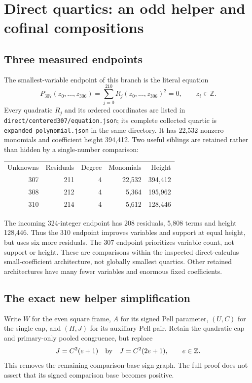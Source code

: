 \section{Direct quartics: an odd helper and cofinal compositions}
\label{sec:round17-direct}

\subsection{Three measured endpoints}
The smallest-variable endpoint of this branch is the literal equation
\[
 P_{307}(z_0,\ldots,z_{306})
   =\sum_{j=0}^{210}R_j(z_0,\ldots,z_{306})^2=0,
 \qquad z_i\in\mathbb Z.
\]
Every quadratic $R_j$ and its ordered coordinates are listed in
\texttt{direct/centered307/equation.json}; its complete collected quartic is
\texttt{expanded\_polynomial.json} in the same directory. It has 22,532
nonzero monomials and coefficient height 394,412. Two useful siblings are
retained rather than hidden by a single-number comparison:
\begin{center}
\begin{tabular}{rrrrr}
Unknowns & Residuals & Degree & Monomials & Height\\
307 & 211 & 4 & 22,532 & 394,412\\
308 & 212 & 4 & 5,364 & 195,962\\
310 & 214 & 4 & 5,612 & 128,446
\end{tabular}
\end{center}
The incoming 324-integer endpoint has 208 residuals, 5,808 terms and height
128,446. Thus the 310 endpoint improves variables and support at equal height,
but uses six more residuals. The 307 endpoint prioritizes variable count, not
support or height. These are comparisons within the inspected direct-calculus
small-coefficient architecture, not globally smallest quartics. Other retained
architectures have many fewer variables and enormous fixed coefficients.

\subsection{The exact new helper simplification}
Write $W$ for the even square frame, $A$ for its signed Pell parameter,
$(U,C)$ for the single cap, and $(H,J)$ for its auxiliary Pell pair. Retain
the quadratic cap and primary-only pooled congruence, but replace
\[
 J=C^2(e+1)\quad\hbox{by}\quad J=C^2(2e+1),\qquad e\in\mathbb Z.
\]
This removes the remaining comparison-base sign graph. The full proof does
not assert that its signed comparison base becomes positive.

